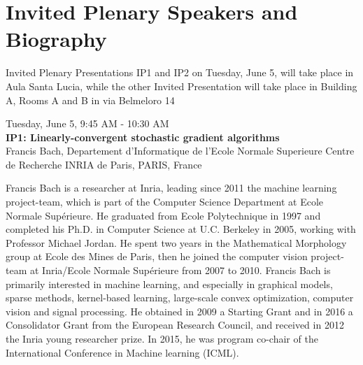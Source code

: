 
\chapter*{Invited Plenary Speakers and Biography}
{\small{Invited Plenary Presentations  IP1 and IP2 on Tuesday, June 5, will take place in Aula Santa Lucia, while the other Invited Presentation will take place in Building A, Rooms A and B in via Belmeloro 14}}

\newpage\vspace{2cm}
\begin{center}{\Large{
Tuesday, June 5, 9:45 AM - 10:30 AM \\
\textbf{IP1: Linearly-convergent stochastic gradient algorithms}\\
Francis Bach, Departement d'Informatique de l'Ecole Normale Superieure Centre de Recherche INRIA de Paris, PARIS, France}}
\end{center}
\vspace{1cm}

\begin{wrapfloat}{figure}{o}{0pt}
  \texttt{[image: \{../app/assets/images/speakers/bardsleyj@mso.umt.edu]}.jpg}
\end{wrapfloat}

Francis Bach is a researcher at Inria, leading since 2011 the machine learning project-team, which is part of the Computer Science Department at Ecole Normale Sup\'erieure. He graduated from Ecole Polytechnique in 1997 and completed his Ph.D. in Computer Science at U.C. Berkeley in 2005, working with Professor Michael Jordan. He spent two years in the Mathematical Morphology group at Ecole des Mines de Paris, then he joined the computer vision project-team at Inria/Ecole Normale Sup\'erieure from 2007 to 2010. Francis Bach is primarily interested in machine learning, and especially in graphical models, sparse methods, kernel-based learning, large-scale convex optimization, computer vision and signal processing. He obtained in 2009 a Starting Grant and in 2016 a Consolidator Grant from the European Research Council, and received in 2012 the Inria young researcher prize. In 2015, he was program co-chair of the International Conference in Machine learning (ICML).\\\\

